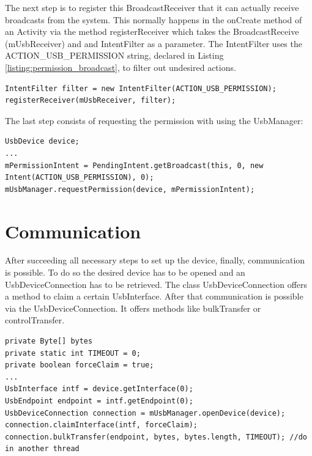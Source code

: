 The next step is to register this BroadcastReceiver that it can actually receive broadcasts from the system. This normally happens in the onCreate method of an Activity via the method registerReceiver which takes the BroadcastReceive (mUsbReceiver) and and IntentFilter as a parameter. The IntentFilter uses the ACTION\_USB\_PERMISSION string, declared in Listing \ref{listing:permission_broadcast}, to filter out undesired actions.

\begin{lstlisting}[caption=Register the BroadcastReceiver \cite{android_usb_host}, label=listing:register_broadcast]
IntentFilter filter = new IntentFilter(ACTION_USB_PERMISSION);
registerReceiver(mUsbReceiver, filter);
\end{lstlisting}

The last step consists of requesting the permission with using the UsbManager:

\begin{lstlisting}[caption=Register the BroadcastReceiver \cite{android_usb_host}, label=listing:request_permission]
UsbDevice device;
...
mPermissionIntent = PendingIntent.getBroadcast(this, 0, new Intent(ACTION_USB_PERMISSION), 0);
mUsbManager.requestPermission(device, mPermissionIntent);
\end{lstlisting}

\section{Communication}

After succeeding all necessary steps to set up the device, finally, communication is possible. To do so the desired device has to be opened and an UsbDeviceConnection has to be retrieved. The class UsbDeviceConnection offers a method to claim a certain UsbInterface. After that communication is possible via the UsbDeviceConnection. It offers methods like bulkTransfer or controlTransfer.

\begin{lstlisting}[caption=Communicating with a connected device \cite{android_usb_host}, label=listing:communication]
private Byte[] bytes
private static int TIMEOUT = 0;
private boolean forceClaim = true;
...
UsbInterface intf = device.getInterface(0);
UsbEndpoint endpoint = intf.getEndpoint(0);
UsbDeviceConnection connection = mUsbManager.openDevice(device); 
connection.claimInterface(intf, forceClaim);
connection.bulkTransfer(endpoint, bytes, bytes.length, TIMEOUT); //do in another thread
\end{lstlisting}

